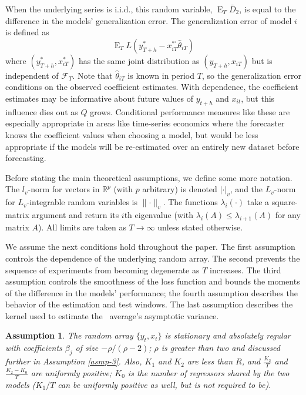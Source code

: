 \documentclass[11pt]{article}
\newtheorem{asmp}{Assumption}
\DeclareMathOperator{\E}{E}
\newcommand{\h}{h}
\renewcommand{\Re}{\ensuremath{\mathbb{R}}}
\begin{document}
When the underlying series is i.i.d., this random variable, $\E_T
\bar{D}_2$, is equal to the difference in the models' generalization
error.  The generalization error of model $i$ is defined as
\begin{equation*}
  \E_{T} L(y_{T+\h}^{*} - x_{iT}^{*\prime}\hat{\theta}_{iT})
\end{equation*}
where $(y_{T+\h}^{*},x_{iT}^{*})$ has the same joint distribution as
$(y_{T+\h}, x_{iT})$ but is independent of $\mathcal{F}_T$.  Note that
$\hat{\theta}_{iT}$ is known in period $T$, so the generalization
error conditions on the observed coefficient estimates.  With
dependence, the coefficient estimates may be informative about future
values of $y_{t+\h}$ and $x_{it}$, but this influence dies out as $Q$
grows.  Conditional performance measures like these are especially
appropriate in areas like time-series economics where the forecaster
knows the coefficient values when choosing a model, but would be less
appropriate if the models will be re-estimated over an entirely new
dataset before forecasting.

Before stating the main theoretical assumptions, we define some more
notation.  The $l_v$-norm for vectors in $\Re^p$ (with $p$ arbitrary)
is denoted $\lvert \cdot \rvert_v$, and the $L_v$-norm for
$L_v$-integrable random variables is $\lVert \cdot \rVert_v$.  The
functions $\lambda_i(\cdot)$ take a square-matrix argument and return
its $i$th eigenvalue (with $\lambda_{i}(A) \leq \lambda_{i+1}(A)$ for
any matrix $A$).
All limits are taken as $T \to \infty$ unless stated otherwise.
 
We assume the next conditions hold throughout the paper.  The first
assumption controls the dependence of the underlying random array.
The second prevents the sequence of experiments from becoming
degenerate as $T$ increases.  The third assumption controls the
smoothness of the loss function and bounds the moments of the
difference in the models' performance; the fourth assumption describes
the behavior of the estimation and test windows.  The last assumption
describes the kernel used to estimate the \oos\ average's asymptotic
variance.

\begin{asmp}\label{asmp-1} 
  The random array $\{y_t,x_t\}$ is stationary and
  absolutely regular with coefficients $\beta_j$ of size
  $-\rho/(\rho-2)$; $\rho$ is greater than two and discussed further
  in Assumption \ref{asmp-3}.  Also, $K_1$ and $K_2$ are less than $R$,
  and $\frac{K_2}{T}$ and $\frac{K_2-K_0}{T}$ are uniformly positive;
  $K_0$ is the number of regressors shared by the two models ($K_1/T$
  can be uniformly positive as well, but is not required to be).
\end{asmp}
\end{document}

